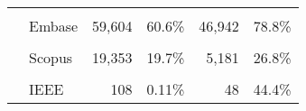 \documentclass[]{bmcart}
\begin{document}
\begin{backmatter}
\begin{table}[H]
{\begin{tabular}[t]{llrlrl}
\cellcolor{gray!6}{All Sessions} & \cellcolor{gray!6}{Total} & \cellcolor{gray!6}{98,371} & \cellcolor{gray!6}{} & \cellcolor{gray!6}{} & \cellcolor{gray!6}{}\\
 & Embase & 59,604 & 60.6\% & 46,942 & 78.8\%\\
\cellcolor{gray!6}{} & \cellcolor{gray!6}{Pubmed} & \cellcolor{gray!6}{37,278} & \cellcolor{gray!6}{37.9\%} & \cellcolor{gray!6}{21,371} & \cellcolor{gray!6}{57.3\%}\\
\addlinespace
 & Scopus & 19,353 & 19.7\% & 5,181 & 26.8\%\\
\cellcolor{gray!6}{} & \cellcolor{gray!6}{WOS} & \cellcolor{gray!6}{14,367} & \cellcolor{gray!6}{14.6\%} & \cellcolor{gray!6}{3,175} & \cellcolor{gray!6}{22.1\%}\\
 & IEEE & 108 & 0.11\% & 48 & 44.4\%\\
\bottomrule
\end{tabular}}
\end{table}


\end{backmatter}
\end{document}
